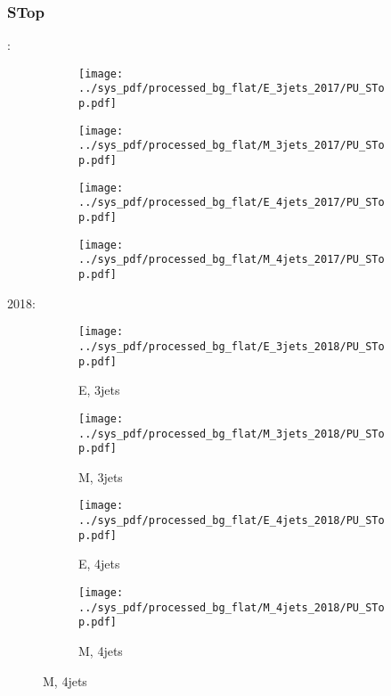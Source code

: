 \documentclass{beamer}
\begin{document}
\begin{frame}
\frametitle{STop}
\fontsize{5}{1}:
\begin{figure}
\centering
\begin{subfigure}[b]{0.24\textwidth}
\texttt{[image: ../sys\_pdf/processed\_bg\_flat/E\_3jets\_2017/PU\_STop.pdf]}
\end{subfigure}
\begin{subfigure}[b]{0.24\textwidth}
\texttt{[image: ../sys\_pdf/processed\_bg\_flat/M\_3jets\_2017/PU\_STop.pdf]}
\end{subfigure}
\begin{subfigure}[b]{0.24\textwidth}
\texttt{[image: ../sys\_pdf/processed\_bg\_flat/E\_4jets\_2017/PU\_STop.pdf]}
\end{subfigure}
\begin{subfigure}[b]{0.24\textwidth}
\texttt{[image: ../sys\_pdf/processed\_bg\_flat/M\_4jets\_2017/PU\_STop.pdf]}
\end{subfigure}
\end{figure}
2018:
\begin{figure}
\centering
\begin{subfigure}[b]{0.24\textwidth}
\texttt{[image: ../sys\_pdf/processed\_bg\_flat/E\_3jets\_2018/PU\_STop.pdf]}
\captionsetup{font=tiny}
\caption{E, 3jets}
\end{subfigure}
\begin{subfigure}[b]{0.24\textwidth}
\texttt{[image: ../sys\_pdf/processed\_bg\_flat/M\_3jets\_2018/PU\_STop.pdf]}
\captionsetup{font=tiny}
\caption{M, 3jets}
\end{subfigure}
\begin{subfigure}[b]{0.24\textwidth}
\texttt{[image: ../sys\_pdf/processed\_bg\_flat/E\_4jets\_2018/PU\_STop.pdf]}
\captionsetup{font=tiny}
\caption{E, 4jets}
\end{subfigure}
\begin{subfigure}[b]{0.24\textwidth}
\texttt{[image: ../sys\_pdf/processed\_bg\_flat/M\_4jets\_2018/PU\_STop.pdf]}
\captionsetup{font=tiny}
\caption{M, 4jets}
\end{subfigure}
\end{figure}
\end{frame}
\end{document}
